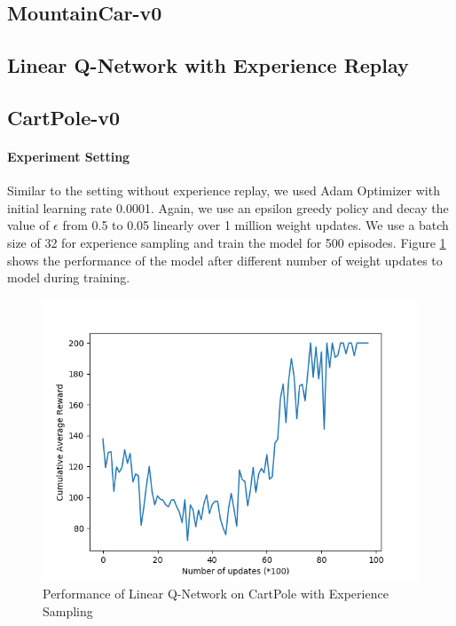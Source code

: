 \documentclass[12pt]{article}
\begin{document}
\pagebreak[4]
\subsection*{MountainCar-v0}

\pagebreak[4]

\subsection{Linear Q-Network with Experience Replay}
\subsection*{CartPole-v0}

\paragraph{Experiment Setting} Similar to the setting without experience replay, we used Adam Optimizer with initial learning rate 0.0001. Again, we use an epsilon greedy policy and decay the value of $\epsilon$ from 0.5 to 0.05 linearly over 1 million weight updates. We use a batch size of 32 for experience sampling and train the model for 500 episodes. Figure \ref{fig:02} shows the performance of the model after different number of weight updates to model during training.
\begin{figure}[h]
  \centering
  \vspace{-5mm}
  \includegraphics[width=0.8\linewidth]{figures/reward_plot_02.png}
  \caption{Performance of Linear Q-Network on CartPole with Experience Sampling}
  \label{fig:02}
\end{figure}
\end{document}
